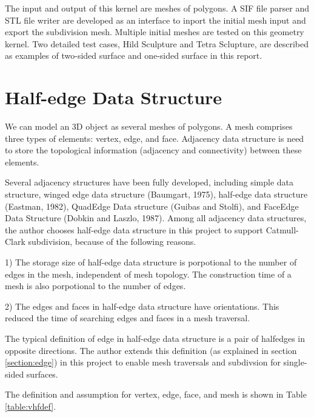 \documentclass[12pt]{article}
\begin{document}
The input and output of this kernel are meshes of polygons. A SIF file parser and STL file writer are developed as an interface to inport the initial mesh input and export the subdivision mesh. Multiple initial meshes are tested on this geometry kernel. Two detailed test cases, Hild Sculpture and Tetra Sclupture, are described as examples of two-sided surface and one-sided surface in this report.

\newpage
\section{Half-edge Data Structure} \label{sec:half-edge}

We can model an 3D object as several meshes of polygons. A mesh comprises three types of elements: vertex, edge, and face. Adjacency data structure is need to store the topological information (adjacency and connectivity) between these elements.

Several adjacency structures have been fully developed, including simple data structure, winged edge data structure (Baumgart, 1975), half-edge data structure (Eastman, 1982), QuadEdge Data structure (Guibas and Stolfi), and FaceEdge Data Structure (Dobkin and Laszlo, 1987). Among all adjacency data structures, the author chooses half-edge data structure in this project to support Catmull-Clark subdivision, because of the following reasons.

1) The storage size of half-edge data structure is porpotional to the number of edges in the mesh, independent of mesh topology. The construction time of a mesh is also porpotional to the number of edges.

2) The edges and faces in half-edge data structure have orientations. This reduced the time of searching edges and faces in a mesh traversal.

The typical definition of edge in half-edge data structure is a pair of halfedges in opposite directions. The author extends this definition (as explained in section \ref{section:edge}) in this project to enable mesh traversals and subdivsion for single-sided surfaces.

The definition and assumption for vertex, edge, face, and mesh is shown in Table \ref{table:vhfdef}.
\end{document}
